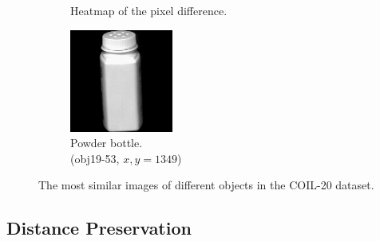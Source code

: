 \begin{figure}[!]
\begin{subfigure}[t]{0.32\columnwidth}
    	\caption{Heatmap of the pixel difference.}
        \label{fig:heatmap_coil20_diff}
    \end{subfigure}
     \hfill
     \begin{subfigure}[t]{0.32\columnwidth}
    	\centering
    	\includegraphics[width=\columnwidth]{images/coil-20-proc/obj19__53.png}
    	\caption{Powder bottle. \\ (obj19-53, $x,y=1349$)}
        \label{fig:obj19__53}
    \end{subfigure}
     \caption[Most Similar of Different Objects COIL-20 Images]{The most similar images of different objects in the COIL-20 dataset.}
    \label{fig:first_most_similar_coil}
\end{figure}

\subsection{Distance Preservation} \label{subsec:dist_coil}

